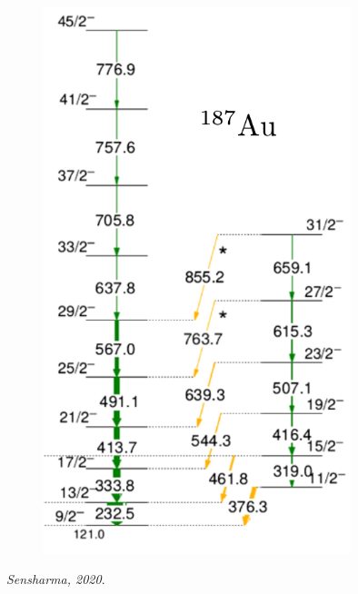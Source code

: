 \documentclass{beamer}
\begin{document}
\begin{frame}
\begin{columns}
\begin{column}{0.4\textwidth}
			\begin{figure}
				\centering
				\includegraphics[width=0.8\textwidth]{figures/au_187_spectra.pdf}
			\end{figure}
			\vspace{-0.4cm}
			\textit{Sensharma, 2020}.
		\end{column}
	\end{columns}
\end{frame}
\end{document}
